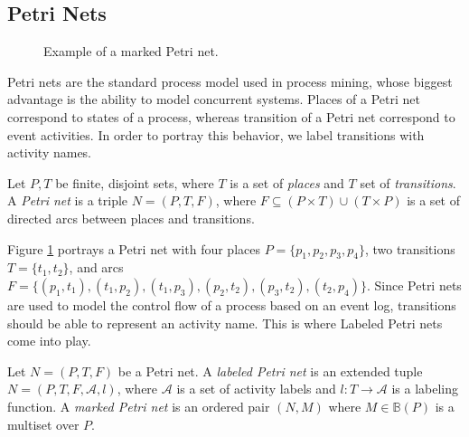 \subsection{Petri Nets}

\begin{figure}[h!]
    \centering
    \caption{Example of a marked Petri net.}
    \label{fig:petrinet}
\end{figure}

Petri nets are the standard process model used in process mining, whose biggest advantage is the ability to model concurrent systems. Places of a Petri net correspond to states of a process, whereas transition of a Petri net correspond to event activities. In order to portray this behavior, we label transitions with activity names.

\begin{definition}
\label{def:petrinet}
    Let $P, T$ be finite, disjoint sets, where $T$ is a set of \emph{places} and $T$ set of \emph{transitions}. A \emph{Petri net} is a triple $N = (P, T, F)$, where $F \subseteq (P \times T) \cup (T \times P)$ is a set of directed arcs between places and transitions.
\end{definition}

Figure \ref{fig:petrinet} portrays a Petri net with four places $P = \{p_1, p_2, p_3, p_4\}$, two transitions $T = \{t_1, t_2\}$, and arcs $F = \{ (p_1, t_1), (t_1, p_2), (t_1, p_3), (p_2, t_2), (p_3, t_2), (t_2, p_4) \}$. Since Petri nets are used to model the control flow of a process based on an event log, transitions should be able to represent an activity name. This is where Labeled Petri nets come into play.

\begin{definition}
    Let $N = (P, T, F)$ be a Petri net. A \emph{labeled Petri net} is an extended tuple $N = (P, T, F, \mathcal{A}, l)$, where $\mathcal{A}$ is a set of activity labels and $l: T \rightarrow \mathcal{A}$ is a labeling function. A \emph{marked Petri net} is an ordered pair $(N, M)$ where $M \in \mathbb{B}(P)$ is a multiset over $P$.
\end{definition}

